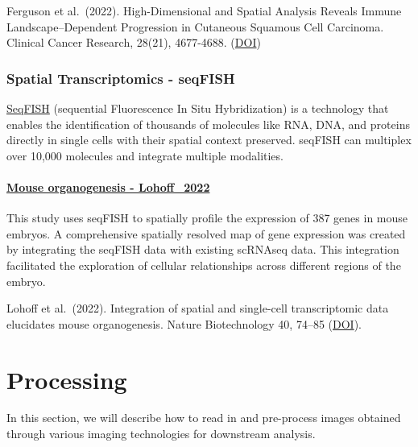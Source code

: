\documentclass[
  letterpaper,
  DIV=11,
  numbers=noendperiod]{scrreprt}
\begin{document}
Ferguson et al.~(2022). High-Dimensional and Spatial Analysis Reveals
Immune Landscape--Dependent Progression in Cutaneous Squamous Cell
Carcinoma. Clinical Cancer Research, 28(21), 4677-4688.
(\href{https://doi.org/10.1158/1078-0432.CCR-22-1332}{DOI})

\subsection*{Spatial Transcriptomics -
seqFISH}\label{spatial-transcriptomics---seqfish}

\href{https://spatial.caltech.edu/seqfish}{SeqFISH} (sequential
Fluorescence In Situ Hybridization) is a technology that enables the
identification of thousands of molecules like RNA, DNA, and proteins
directly in single cells with their spatial context preserved. seqFISH
can multiplex over 10,000 molecules and integrate multiple modalities.

\subsubsection*{\texorpdfstring{\href{datasets/Lohoff_2022/Lohoff_2022.qmd}{Mouse
organogenesis -
Lohoff\_2022}}{Mouse organogenesis - Lohoff\_2022}}\label{mouse-organogenesis---lohoff_2022}

This study uses seqFISH to spatially profile the expression of 387 genes
in mouse embryos. A comprehensive spatially resolved map of gene
expression was created by integrating the seqFISH data with existing
scRNAseq data. This integration facilitated the exploration of cellular
relationships across different regions of the embryo.

Lohoff et al.~(2022). Integration of spatial and single-cell
transcriptomic data elucidates mouse organogenesis. Nature Biotechnology
40, 74--85 (\href{https://doi.org/10.1038/s41587-021-01006-2}{DOI}).


\chapter{Processing}\label{processing}

In this section, we will describe how to read in and pre-process images
obtained through various imaging technologies for downstream analysis.
\end{document}
